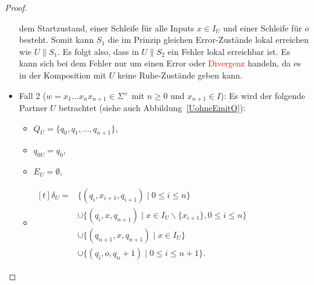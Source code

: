 \begin{proof}
\begin{itemize}
      dem Startzustand, einer Schleife für alle Inputs $x\in I_U$ und einer
      Schleife für $o$ besteht. Somit kann $S_1$ die im Prinzip gleichen
      Error-Zustände lokal erreichen wie $U\|S_1$. Es folgt also, dass in
      $U\|S_2$ ein Fehler lokal erreichbar ist. Es kann sich bei dem Fehler nur
      um einen Error oder \textcolor{red}{Divergenz} handeln, da es in der Komposition mit $U$
      keine Ruhe-Zustände geben kann.
    \item Fall 2 ($w=x_1\dots x_nx_{n+1}\in\Sigma{} ^+$ mit $n\geq 0$ und
      $x_{n+1}\in I$): Es wird der folgende Partner $U$ betrachtet (siehe auch
      Abbildung~\ref{UohneEmitO}):
      \begin{itemize}
        \item $Q_U=\{q_0,q_1,\dots ,q_{n+1}\}$,
        \item $q_{0U}=q_0$,
        \item $E_U=\emptyset$,
        \item $\begin{aligned}[t]
            \delta _U=&\{(q_i,x_{i+1},q_{i+1})\mid  0\leq i\leq n\}\\
                      &\cup\{(q_i,x,q_{n+1})\mid  x\in I_U\backslash\{x_{i+1}\},
          0\leq i\leq n\}\\
          &\cup\{(q_{n+1},x,q_{n+1})\mid  x\in I_U\}\\
          &\cup\{(q_i,o,q_n+1)\mid 0\leq i\leq n+1\}.
        \end{aligned}$
      \end{itemize}
      \begin{figure} [h!tbp]
      \begin{center}
\end{center}
\end{figure}
\end{itemize}
\end{proof}
